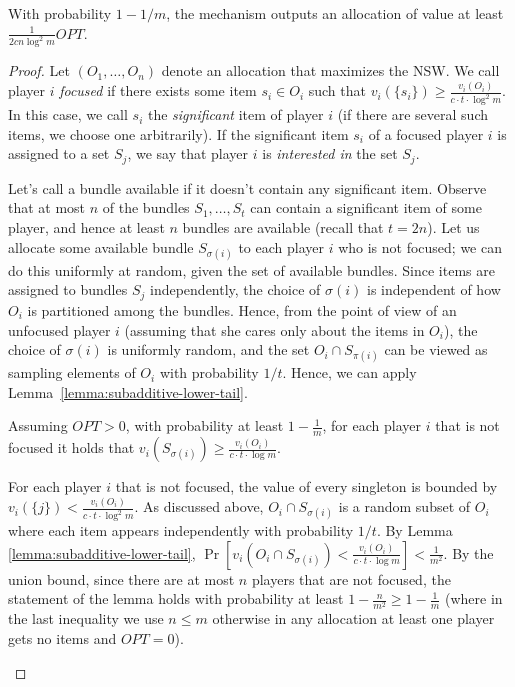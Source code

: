\documentclass{theoretics}
\begin{document}
\begin{lemma}
With probability $1-1/m$, the mechanism outputs an allocation of value at least  $\frac{1}{2c n \log^2 m} OPT$.
\end{lemma}

\begin{proof}
Let $(O_1,\ldots, O_n)$ denote an allocation that maximizes the NSW. We call player $i$ \emph{focused} if there exists some item $s_i \in O_i$ such that $v_i(\{s_i\})\geq \frac {v_i(O_i)} {c\cdot t \cdot \log^2 m}$. In this case, we call $s_i$ the \emph{significant} item of player $i$ (if there are several such items, we choose one arbitrarily). If the significant item $s_i$ of a focused player $i$ is assigned to a set $S_j$, we say that player $i$ is \emph{interested in} the set $S_j$.

Let's call a bundle available if it doesn't contain any significant item.  Observe that at most $n$ of the bundles $S_1,\ldots,S_t$ can contain a significant item of some player, and hence at least $n$ bundles are available (recall that $t=2n$). Let us allocate some available bundle $S_{\sigma(i)}$ to each player $i$ who is not focused; we can do this uniformly at random, given the set of available bundles. Since items are assigned to bundles $S_j$ independently, the choice of $\sigma(i)$ is independent of how $O_i$ is partitioned among the bundles. Hence, from the point of view of an unfocused player $i$ (assuming that she cares only about the items in $O_i$), the choice of $\sigma(i)$ is uniformly random, and the set $O_i \cap S_{\pi(i)}$ can be viewed as sampling elements of $O_i$ with probability $1/t$. Hence, we can apply Lemma~\ref{lemma:subadditive-lower-tail}. 





\begin{claim*}\label{algs-corollary-non-focused-value}
Assuming $OPT>0$, with probability at least $1-\frac 1 {m}$, for each player $i$ that is not focused it holds that $v_i(S_{\sigma(i)}) \geq \frac {v_i(O_i)} {c\cdot t\cdot \log m}$.   
\end{claim*}

\begin{subproof}
For each player $i$ that is not focused, the value of every singleton is bounded by $v_i(\{j\}) < \frac{v_i(O_i)}{c \cdot t \cdot \log^2m}$.
As discussed above, $O_i \cap S_{\sigma(i)}$ is a random subset of $O_i$ where each item appears independently with probability $1/t$.
By Lemma \ref{lemma:subadditive-lower-tail}, 
 $\Pr[v_i(O_i \cap S_{\sigma(i)}) < \frac {v_i(O_i)} {c \cdot t \cdot\log m}]<\frac 1 {m^2}$. By the union bound, since there are at most $n$ players that are not focused, the statement of the lemma holds with probability at least $1-\frac n {m^2}\geq 1 - \frac 1 m$
(where in the last inequality we use $n\leq m$ otherwise in any allocation at least one player gets no items and $OPT =0$).
\end{subproof}


\end{proof}
\end{document}
